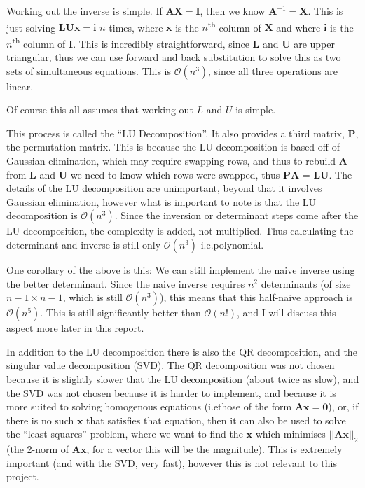 \documentclass[12pt]{article}
\begin{document}
Working out the inverse is simple. If $\mathbf{AX}=\mathbf{I}$, then we know $\mathbf{A}^{-1} = \mathbf{X}$. This is just solving $\mathbf{LUx}=\mathbf{i}$ $n$ times, where $\mathbf{x}$ is the $n$\textsuperscript{th} column of $\mathbf{X}$ and where $\mathbf{i}$ is the $n$\textsuperscript{th} column of $\mathbf{I}$. This is incredibly straightforward, since $\mathbf{L}$ and $\mathbf{U}$ are upper triangular, thus we can use forward and back substitution to solve this as two sets of simultaneous equations. This is $\mathcal{O}(n^3)$, since all three operations are linear.

Of course this all assumes that working out $L$ and $U$ is simple.

This process is called the ``LU Decomposition''\cite{lu_decomposition}. It also provides a third matrix, $\mathbf{P}$, the permutation matrix. This is because the LU decomposition is based off of Gaussian elimination, which may require swapping rows, and thus to rebuild $\mathbf{A}$ from $\mathbf{L}$ and $\mathbf{U}$ we need to know which rows were swapped, thus $\mathbf{PA}$ = $\mathbf{LU}$. The details of the LU decomposition are unimportant, beyond that it involves Gaussian elimination, however what is important to note is that the LU decomposition is $\mathcal{O}(n^3)$. Since the inversion or determinant steps come after the LU decomposition, the complexity is added, not multiplied. Thus calculating the determinant and inverse is still only $\mathcal{O}(n^3)$ i.e.\@ polynomial.

One corollary of the above is this: We can still implement the naive inverse using the better determinant. Since the naive inverse requires $n^2$ determinants (of size $n-1 \times n-1$, which is still $\mathcal{O}(n^3)$), this means that this half-naive approach is $\mathcal{O}(n^5)$. This is still significantly better than $\mathcal{O}(n!)$, and I will discuss this aspect more later in this report.

In addition to the LU decomposition there is also the QR decomposition, and the singular value decomposition (SVD)\cite{num_lin_alg}. The QR decomposition was not chosen because it is slightly slower that the LU decomposition (about twice as slow), and the SVD was not chosen because it is harder to implement, and because it is more suited to solving homogenous equations (i.e\@ those of the form $\mathbf{A}\mathbf{x}=\mathbf{0}$), or, if there is no such $\mathbf{x}$ that satisfies that equation, then it can also be used to solve the ``least-squares'' problem, where we want to find the $\mathbf{x}$ which minimises $||\mathbf{Ax}||_2$ (the 2-norm of $\mathbf{Ax}$, for a vector this will be the magnitude). This is extremely important (and with the SVD, very fast), however this is not relevant to this project.
\end{document}
